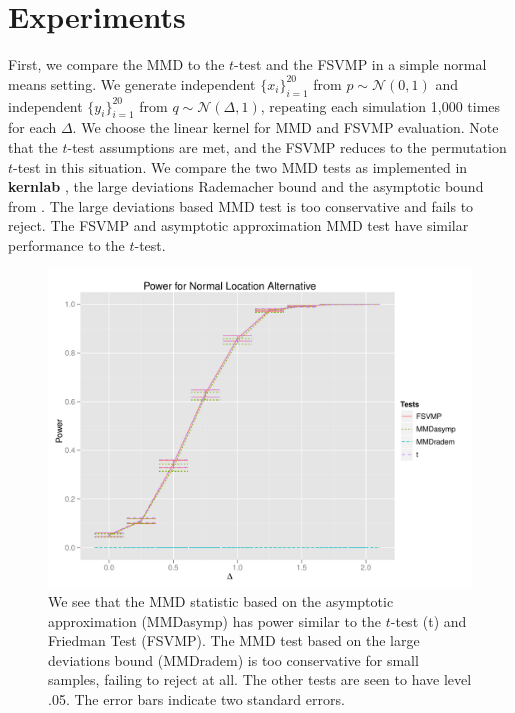 \documentclass{article} %
\theoremstyle{remark}
\begin{document}
\section{Experiments}
First, we compare the MMD to the $t$-test and the FSVMP in a simple
normal means setting.  We generate independent $\{x_i\}_{i=1}^{20}$ from $p \sim
\mathcal{N}(0,1)$ and independent $\{y_i\}_{i=1}^{20}$ from $q \sim
\mathcal{N}(\Delta,1)$, repeating each simulation 1,000 times for each
$\Delta$.  We choose the linear kernel for MMD and FSVMP
evaluation.  Note that the $t$-test assumptions are met, and the FSVMP
reduces to the permutation $t$-test in this situation.   We compare the
two MMD tests as implemented in {\bf kernlab} \cite{kernlab}, the
large deviations Rademacher bound and the asymptotic bound from
\cite{gretton19m}.  The large deviations based MMD test is too
conservative and fails to reject.  The FSVMP and asymptotic
approximation MMD test have similar performance to the $t$-test. 

\begin{figure}[h!]
  \centering
  \includegraphics[width=.8\linewidth]{nips1.pdf}
  \caption{We see that the MMD statistic based on the asymptotic
    approximation (MMDasymp) has power similar to the $t$-test (t) and
    Friedman Test (FSVMP).  The MMD test based on the large deviations
  bound (MMDradem) is too conservative for small samples, failing to
  reject at all.  The other tests are seen to have level .05.  The
  error bars indicate two standard errors.}
\end{figure}
\end{document}

